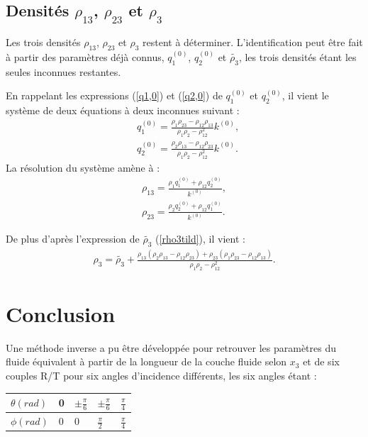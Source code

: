 \documentclass[12pt]{report}
\begin{document}
\subsection{Densités $\rho_{13}$, $\rho_{23}$ et $\rho_3$}
\label{Ch_Inv_S_rho_SS_rho13/23/3}
    Les trois densités $\rho_{13}$, $\rho_{23}$ et $\rho_3$ restent à déterminer. L'identification peut être fait à partir des paramètres déjà connus, $q_1^{(0)}$, $q_2^{(0)}$ et $\tilde{\rho_3}$, les trois densités étant les seules inconnues restantes.
    
    En rappelant les expressions (\ref{q1,0}) et (\ref{q2,0}) de $q_1^{(0)}$ et $q_2^{(0)}$, il vient le système de deux équations à deux inconnues suivant :
    \begin{align*}
    &q_1^{(0)}=\frac{\rho_1\rho_{23}-\rho_{12}\rho_{13}}{\rho_1\rho_2-\rho_{12}^2}k^{(0)},\\
    &q_2^{(0)}=\frac{\rho_2\rho_{13}-\rho_{12}\rho_{23}}{\rho_1\rho_2-\rho_{12}^2}k^{(0)}.
    \end{align*}
    La résolution du système amène à :
    \begin{align*}
    \rho_{13}=\frac{\rho_1q_1^{(0)}+\rho_{12}q_2^{(0)}}{k^{(0)}},\\
    \rho_{23}=\frac{\rho_2q_2^{(0)}+\rho_{12}q_1^{(0)}}{k^{(0)}}.
    \end{align*}

    De plus d'après l'expression de $\tilde{\rho_3}$ (\ref{rho3tild}), il vient :
    \begin{align}
    \rho_3=\tilde{\rho_3}+\frac{\rho_{13}(\rho_2\rho_{13}-\rho_{12}\rho_{23})+\rho_{23}(\rho_1\rho_{23}-\rho_{12}\rho_{13})}{\rho_1\rho_2-\rho_{12}^2}.
    \end{align}
    
\section{Conclusion}
\label{Ch_Inv_S_Conc}
    Une méthode inverse a pu être développée pour retrouver les paramètres du fluide équivalent à partir de la longueur de la couche fluide selon $x_3$ et de six couples R/T pour six angles d'incidence différents, les six angles étant :\\
    \begin{tabular}{||m{3cm}||m{3cm}|m{3cm}|m{3cm}|m{3cm}|}
         \hline
         $\theta (rad)$ & 0 & $\pm\frac{\pi}{6}$ & $\pm\frac{\pi}{6}$ & $\frac{\pi}{4}$ \\ \hline 
          $\phi (rad)$ & 0 & 0 & $\frac{\pi}{2}$ & $\frac{\pi}{4}$
          \\ \hline
    \end{tabular}\\
    
\end{document}
